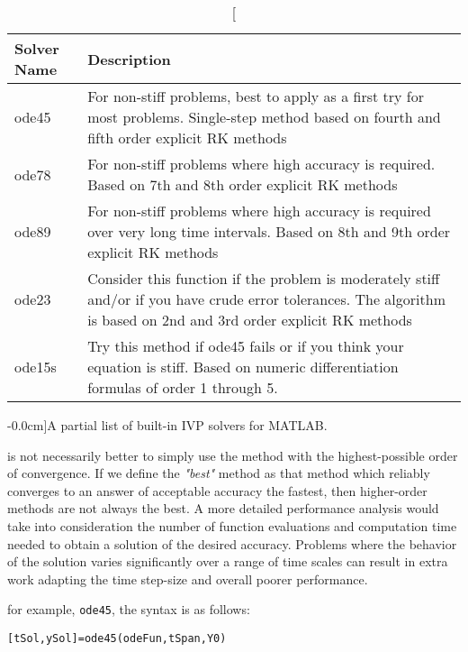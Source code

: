 \begin{table}[h]
\centering
\begin{tabular}{|p{1.25in}|p{3.0in}|}
\hline
\textbf{Solver Name} & \textbf{Description} \\
\hline
ode45 & For non-stiff problems, best to apply as a first try for most problems. Single-step method based on fourth and fifth order explicit RK methods \\ \hline
ode78 & For non-stiff problems where high accuracy is required.  Based on 7th and 8th order explicit RK methods \\ \hline
ode89 & For non-stiff problems where high accuracy is required over very long time intervals. Based on 8th and 9th order explicit RK methods\\ \hline
ode23 & Consider this function if the problem is moderately stiff and/or if you have crude error tolerances. The algorithm is based on 2nd and 3rd order explicit RK methods\\ \hline
ode15s & Try this method if ode45 fails or if you think your equation is stiff. Based on numeric differentiation formulas of order 1 through 5. \\ \hline
\end{tabular}
\caption[][-0.0cm]{A partial list of built-in IVP solvers for MATLAB.}
\label{tab:lec27n-1}
\end{table}

 is not necessarily better to simply use the method with the highest-possible order of convergence.  If we define the \emph{"best"} method as that method which reliably converges to an answer of acceptable accuracy the fastest, then higher-order methods are not always the best.  A more detailed performance analysis would take into consideration the number of function evaluations and computation time needed to obtain a solution of the desired accuracy.  Problems where the behavior of the solution varies significantly over a range of time scales can result in extra work adapting the time step-size and overall poorer performance.

 for example, \lstinline[style=myMatlab]{ode45}, the syntax is as follows:


\vspace{0.25cm}

\noindent\parbox{\textwidth}{
\centering
\lstinline[style=myMatlab]{[tSol,ySol]=ode45(odeFun,tSpan,Y0)}
}

